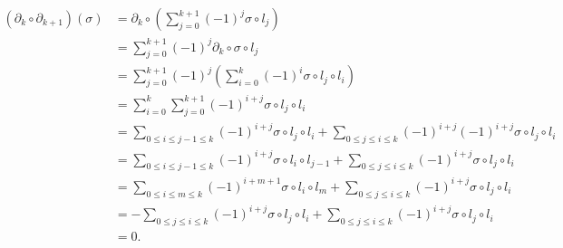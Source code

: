 \documentclass{report}
\begin{document}
\begin{prf}
	\[
		\begin{aligned}
			\left(\partial_k\circ\partial_{k+1}\right)(\sigma) & =\partial_{k}\circ\left(\sum_{j=0}^{k+1}(-1)^{j}\sigma\circ l_j\right)                                                           \\
			                                                   & =\sum_{j=0}^{k+1}(-1)^{j}\partial_{k}\circ\sigma\circ l_j                                                                        \\
			                                                   & =\sum_{j=0}^{k+1}(-1)^{j}\left(\sum_{i=0}^k(-1)^{i}\sigma\circ l_j\circ l_i\right)                                               \\
			                                                   & =\sum_{i=0}^{k}\sum_{j=0}^{k+1}(-1)^{i+j}\sigma\circ l_j\circ l_i                                                                \\
			                                                   & =\sum_{0\le i\le j-1\le k}(-1)^{i+j}\sigma\circ l_j\circ l_i+\sum_{0\le j\le i\le k}(-1)^{i+j}(-1)^{i+j}\sigma\circ l_j\circ l_i \\
			                                                   & =\sum_{0\le i\le j-1\le k}(-1)^{i+j}\sigma\circ l_i\circ l_{j-1}+\sum_{0\le j\le i\le k}(-1)^{i+j}\sigma\circ l_j\circ l_i       \\
			                                                   & =\sum_{0\le i\le m\le k}(-1)^{i+m+1}\sigma\circ l_i\circ l_{m}+\sum_{0\le j\le i\le k}(-1)^{i+j}\sigma\circ l_j\circ l_i         \\
			                                                   & =-\sum_{0\le j\le i\le k}(-1)^{i+j}\sigma\circ l_j\circ l_{i}+\sum_{0\le j\le i\le k}(-1)^{i+j}\sigma\circ l_j\circ l_i          \\
			                                                   & =0.
		\end{aligned}
	\]
\end{prf}
\end{document}
